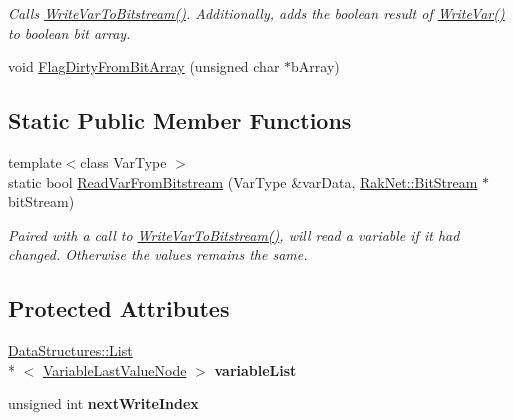 \begin{DoxyCompactItemize}
\begin{DoxyCompactList}\small\item\em Calls \hyperlink{class_rak_net_1_1_variable_list_delta_tracker_a349cf26aa8c11dd567babb507241dd72}{Write\-Var\-To\-Bitstream()}. Additionally, adds the boolean result of \hyperlink{class_rak_net_1_1_variable_list_delta_tracker_a1b290d704a8c53be32a7613f86f113f4}{Write\-Var()} to boolean bit array. \end{DoxyCompactList}\item 
void \hyperlink{class_rak_net_1_1_variable_list_delta_tracker_a1e8263d93c52d3ba915bf7b6cf403e37}{Flag\-Dirty\-From\-Bit\-Array} (unsigned char $\ast$b\-Array)
\end{DoxyCompactItemize}
\subsection*{Static Public Member Functions}
\begin{DoxyCompactItemize}
\item 
\hypertarget{class_rak_net_1_1_variable_list_delta_tracker_a107d8082f40358de5025f1f44e93c47f}{{\footnotesize template$<$class Var\-Type $>$ }\\static bool \hyperlink{class_rak_net_1_1_variable_list_delta_tracker_a107d8082f40358de5025f1f44e93c47f}{Read\-Var\-From\-Bitstream} (Var\-Type \&var\-Data, \hyperlink{class_rak_net_1_1_bit_stream}{Rak\-Net\-::\-Bit\-Stream} $\ast$bit\-Stream)}\label{class_rak_net_1_1_variable_list_delta_tracker_a107d8082f40358de5025f1f44e93c47f}

\begin{DoxyCompactList}\small\item\em Paired with a call to \hyperlink{class_rak_net_1_1_variable_list_delta_tracker_a349cf26aa8c11dd567babb507241dd72}{Write\-Var\-To\-Bitstream()}, will read a variable if it had changed. Otherwise the values remains the same. \end{DoxyCompactList}\end{DoxyCompactItemize}
\subsection*{Protected Attributes}
\begin{DoxyCompactItemize}
\item 
\hypertarget{class_rak_net_1_1_variable_list_delta_tracker_adf4066c4c0b0a4d327e2180852c91ae6}{\hyperlink{class_data_structures_1_1_list}{Data\-Structures\-::\-List}\\*
$<$ \hyperlink{struct_rak_net_1_1_variable_list_delta_tracker_1_1_variable_last_value_node}{Variable\-Last\-Value\-Node} $>$ {\bfseries variable\-List}}\label{class_rak_net_1_1_variable_list_delta_tracker_adf4066c4c0b0a4d327e2180852c91ae6}

\item 
\hypertarget{class_rak_net_1_1_variable_list_delta_tracker_a791777bbb0619ea65a618413221ea81f}{unsigned int {\bfseries next\-Write\-Index}}\label{class_rak_net_1_1_variable_list_delta_tracker_a791777bbb0619ea65a618413221ea81f}

\end{DoxyCompactItemize}


